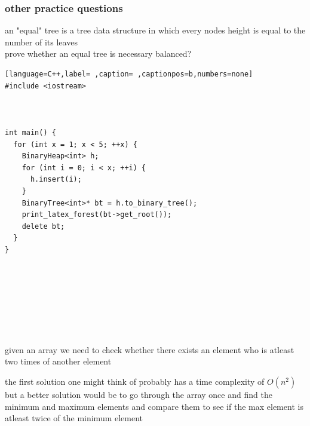 \documentclass[a4paper,12pt]{article}
\begin{document}
\subsubsection{other practice questions}
\label{sec:org3b4b641}
\begin{question}
an "equal" tree is a tree data structure in which every nodes height is equal to the number of its leaves\\[0pt]
prove whether an equal tree is necessary balanced?\\[0pt]

\begin{lstlisting}[language=C++,label= ,caption= ,captionpos=b,numbers=none]
#include <iostream>



int main() {
  for (int x = 1; x < 5; ++x) {
    BinaryHeap<int> h;
    for (int i = 0; i < x; ++i) {
      h.insert(i);
    }
    BinaryTree<int>* bt = h.to_binary_tree();
    print_latex_forest(bt->get_root());
    delete bt;
  }
}
\end{lstlisting}

\begin{center}

\end{center}\\[0pt]

\begin{center}

\end{center}\\[0pt]

\begin{center}

\end{center}\\[0pt]

\begin{center}

\end{center}\\[0pt]
\end{question}

\begin{question}
given an array we need to check whether there exists an element who is atleast two times of another element\\[0pt]
\begin{answer}
the first solution one might think of probably has a time complexity of \(O(n^2)\)\\[0pt]
but a better solution would be to go through the array once and find the minimum and maximum elements and compare them to see if the max element is atleast twice of the minimum element\\[0pt]
\end{answer}
\end{question}
\end{document}
